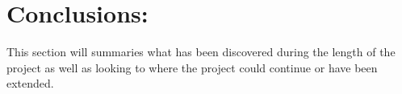 \clearpage
\section{Conclusions:}
\label{sec:con}

This section will summaries what has been discovered during the length of the project as well as looking to where the project could continue or have been extended.


